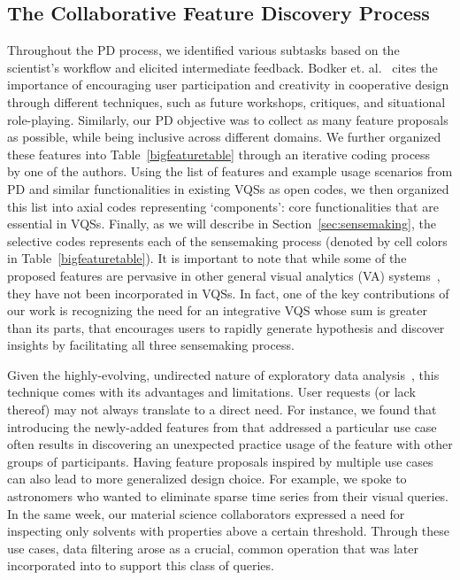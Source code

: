 {  \subsection{The Collaborative Feature Discovery Process}
  \par Throughout the PD process, we identified various subtasks based on the scientist's workflow and elicited intermediate feedback.
  Bodker et. al.~\cite{BodkerGronbaek} cites the importance of encouraging user participation and creativity in cooperative design through different techniques, such as future workshops, critiques, and situational role-playing. Similarly, our PD objective was to collect as many feature proposals as possible, while being inclusive across different domains. We further organized these features into Table~\ref{bigfeaturetable} through an iterative coding process~\cite{Muller2012} by one of the authors. Using the list of features and example usage scenarios from PD and similar functionalities in existing VQSs as open codes, we then organized this list into axial codes representing `components': core functionalities that are essential in VQSs. Finally, as we will describe in Section~\ref{sec:sensemaking}, the selective codes represents each of the sensemaking process (denoted by cell colors in Table~\ref{bigfeaturetable}). It is important to note that while some of the proposed features are pervasive in other general visual analytics (VA) systems~\cite{Heer2012,Amar2005}, they have not been incorporated in VQSs. In fact, one of the key contributions of our work is recognizing the need for an integrative VQS whose sum is greater than its parts, that encourages users to rapidly generate hypothesis and discover insights by facilitating all three sensemaking process.
  \par Given the highly-evolving, undirected nature of exploratory data analysis~\cite{Keim2006,Tukey1970}, this technique comes with its advantages and limitations. User requests (or lack thereof) may not always translate to a direct need. For instance, we found that introducing the newly-added features from \zvpp that addressed a particular use case often results in discovering an unexpected practice usage of the feature with other groups of participants. Having feature proposals inspired by multiple use cases can also lead to more generalized design choice. For example, we spoke to astronomers who wanted to eliminate sparse time series from their visual queries. In the same week, our material science collaborators expressed a need for inspecting only solvents with properties above a certain threshold. Through these use cases, data filtering arose as a crucial, common operation that was later incorporated into \zvpp to support this class of queries.
}
